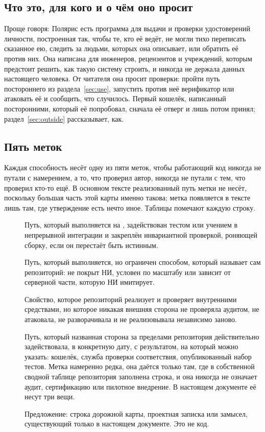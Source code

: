\subsection*{Что это, для кого и о чём оно просит}

Проще говоря: Полярис есть программа для выдачи и проверки удостоверений личности, построенная так,
чтобы те, кто её ведёт, не могли тихо переписать сказанное ею, следить за людьми, которых она
описывает, или обратить её против них. Она написана для инженеров, рецензентов и учреждений,
которым предстоит решить, как такую систему строить, и никогда не держала данных настоящего
человека. От читателя она просит проверки: пройти путь постороннего из раздела~\ref{sec:use},
запустить против неё верификатор или атаковать её и сообщить, что случилось. Первый кошелёк,
написанный посторонними, который её попробовал, сначала её отверг и лишь потом принял; раздел~\ref{sec:outside}
рассказывает, как.

\subsection*{Пять меток}

Каждая способность несёт одну из пяти меток, чтобы работающий код никогда не путали с
намерением, а то, что проверил автор, никогда не путали с тем, что проверил кто-то ещё.
В основном тексте реализованный путь метки не несёт, поскольку большая часть этой карты именно
такова; метка появляется в тексте лишь там, где утверждение есть нечто иное. Таблицы помечают каждую
строку.

\begin{description}
  \item[\sImplMark] Путь, который выполняется на , задействован тестом или учением
    в непрерывной интеграции и закреплён инвариантной проверкой, роняющей сборку, если он
    перестаёт быть истинным.
  \item[\sExp] Путь, который выполняется, но ограничен способом, который называет сам
    репозиторий: не покрыт НИ, условен по масштабу или зависит от серверной части, которую НИ
    имитирует.
  \item[\sExt] Свойство, которое репозиторий реализует и проверяет внутренними средствами, но
    которое никакая внешняя сторона не проверяла аудитом, не атаковала, не разворачивала и не
    реализовывала независимо заново.
  \item[\sWit] Путь, который названная сторона за пределами репозитория действительно
    задействовала, в конкретную дату, с результатом, на который можно указать: кошелёк, служба
    проверки соответствия, опубликованный набор тестов. Метка намеренно редка, она даётся только
    там, где в собственной сводной таблице репозитория заполнена строка, и она никогда не
    означает аудит, сертификацию или пилотное внедрение. В настоящем документе её несут три
    вещи.
  \item[\sFut] Предложение: строка дорожной карты, проектная записка или замысел, существующий
    только в настоящем документе. Это не код.
\end{description}

